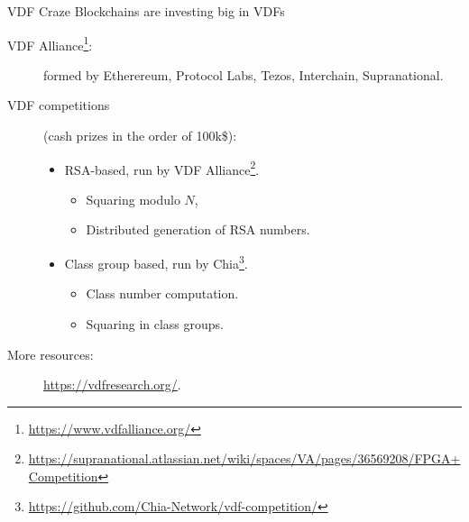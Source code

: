 \documentclass[aspectratio=169]{beamer}
\begin{document}
\begin{frame}{VDF Craze}
  Blockchains  are investing big in VDFs

  \begin{description}
  \item[VDF Alliance\footnote{\url{https://www.vdfalliance.org/}}:]
    formed by Etherereum, Protocol Labs, Tezos, Interchain,
    Supranational.
  \item[VDF competitions] (cash prizes in the order of 100k\$):
    \begin{itemize}
    \item RSA-based, run by VDF
      Alliance\footnote{\url{https://supranational.atlassian.net/wiki/spaces/VA/pages/36569208/FPGA+Competition}}.
      \begin{itemize}
      \item Squaring modulo $N$,
      \item Distributed generation of RSA numbers.
      \end{itemize}
    \item Class group based, run by
      Chia\footnote{\url{https://github.com/Chia-Network/vdf-competition/}}.
      \begin{itemize}
      \item Class number computation.
      \item Squaring in class groups.
      \end{itemize}
    \end{itemize}
  \item[More resources:] \url{https://vdfresearch.org/}.
  \end{description}
\end{frame}

\end{document}
